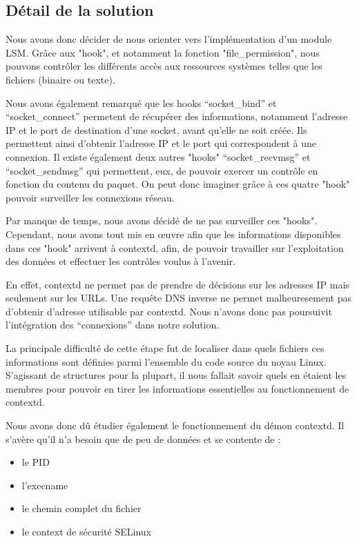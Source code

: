 \documentclass[pdftex,a4paper,titlepage,11pt]{article}
\begin{document}
\subsection{Détail de la solution}

Nous avons donc décider de nous orienter vers l'implémentation d'un module LSM. Grâce aux "hook", et notamment la fonction "file\_permission", nous pouvons contrôler les différents accès aux ressources systèmes telles que les fichiers (binaire ou texte).

Nous avons également remarqué que les hooks ``socket\_bind'' et ``socket\_connect'' permetent de récupérer des informations, notamment l'adresse IP et le port de destination d'une socket, avant qu'elle ne soit créée. Ils permettent ainsi d'obtenir l'adresse IP et le port qui correspondent à une connexion. Il existe également deux autres "hooks" ``socket\_recvmsg'' et ``socket\_sendmsg'' qui permettent, eux, de pouvoir exercer un contrôle en fonction du contenu du paquet. On peut donc imaginer grâce à ces quatre "hook" pouvoir surveiller les connexions réseau.

Par manque de temps, nous avons décidé de ne pas surveiller ces "hooks". Cependant, nous avons tout mis en œuvre afin que les informations disponibles dans ces "hook" arrivent à contextd, afin, de pouvoir travailler sur l'exploitation des données et effectuer les contrôles voulus à l'avenir.

En effet, contextd ne permet pas de prendre de décisions sur les adresses IP mais seulement sur les URLs. Une requête DNS inverse ne permet malheuresement pas d'obtenir d'adresse utilisable par contextd. Nous n'avons donc pas poursuivit l'intégration des ``connexions'' dans notre solution.

La principale difficulté de cette étape fut de localiser dans quels fichiers ces informations sont définies parmi l'ensemble du code source du noyau Linux. S'agissant de structures pour la plupart, il nous fallait savoir quels en étaient les membres pour pouvoir en tirer les informations essentielles au fonctionnement de contextd.

Nous avons donc dû étudier également le fonctionnement du démon contextd. Il s'avère qu'il n'a besoin que de peu de données et se contente de :
	\begin{itemize}
		\item le PID
		\item l'execname
		\item le chemin complet du fichier
		\item le context de sécurité SELinux~\\
	\end{itemize}
	
\end{document}
